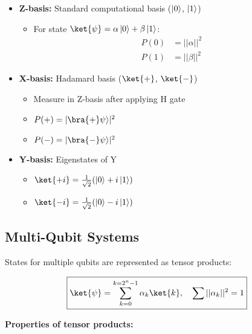   \begin{itemize}
    \item \textbf{Z-basis:} Standard computational basis ($\left|0\right\rangle$, $\left|1\right\rangle$)

      \begin{itemize}[label={*}]
        \item For state $\ket{\psi} = \alpha\zero + \beta\one$:
          \begin{align*}
            P(0) &= ||\alpha||^2 \\
            P(1) &= ||\beta||^2
          \end{align*}
      \end{itemize}

    \item \textbf{X-basis:} Hadamard basis ($\ket{+}$, $\ket{-}$)

      \begin{itemize}[label={*}]
        \item Measure in Z-basis after applying H gate

        \item $P(+) = |\bra{+}\psi\rangle|^2$

        \item $P(-) = |\bra{-}\psi\rangle|^2$
      \end{itemize}

    \item \textbf{Y-basis:} Eigenstates of Y

      \begin{itemize}[label={*}]
        \item $\ket{+i} = \frac{1}{\sqrt{2}}(\zero + i\one)$

        \item $\ket{-i} = \frac{1}{\sqrt{2}}(\zero - i\one)$
      \end{itemize}

  \end{itemize}

  \subsection*{Multi-Qubit Systems}

  States for multiple qubits are represented as
  tensor products:

  \[
    \boxed{
      \ket{\psi} = \sum_{k=0}^{k = 2^n-1} \alpha_k \ket{k}, \quad \sum
      ||\alpha_k||^2 = 1
    }
  \]

  \noindent
  \textbf{Properties of tensor products:}

